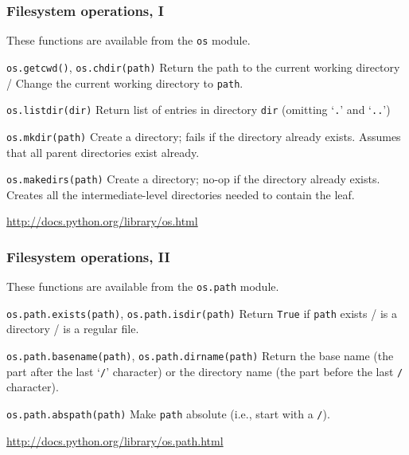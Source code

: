 \documentclass[english,serif,mathserif,xcolor=pdftex,dvipsnames,table]{beamer}
\begin{document}
\begin{frame}[fragile]
  \frametitle{Filesystem operations, I}
  \small
  These functions are available from the \texttt{os} module.

  \begin{describe}{\lstinline|os.getcwd()|, \lstinline|os.chdir(path)|}
    Return the path to the current working directory /
    Change the current working directory to \texttt{path}.
  \end{describe}

  \begin{describe}{\lstinline|os.listdir(dir)|}
    Return list of entries in directory \texttt{dir} (omitting
    `\texttt{.}' and `\texttt{..}')
  \end{describe}

  \begin{describe}{\lstinline|os.mkdir(path)|}
    Create a directory; fails if the directory already exists.
    Assumes that all parent directories exist already.
  \end{describe}

  \begin{describe}{\lstinline|os.makedirs(path)|}
    Create a directory; no-op if the directory already exists.
    Creates all the intermediate-level directories needed to contain
    the leaf.
  \end{describe}

  \begin{references}
    \url{http://docs.python.org/library/os.html}
  \end{references}
\end{frame}


\begin{frame}[fragile]
  \frametitle{Filesystem operations, II}
  These functions are available from the \texttt{os.path} module.

  \begin{describe}{\lstinline|os.path.exists(path)|,
      \lstinline|os.path.isdir(path)|}
    Return \texttt{True} if \texttt{path} exists / is a directory / is
    a regular file.
  \end{describe}

  \begin{describe}{\lstinline|os.path.basename(path)|,
      \lstinline|os.path.dirname(path)|}
    Return the base name (the part after the last `\texttt{/}'
    character) or the directory name (the part before the last
    \texttt{/} character).
  \end{describe}

  \begin{describe}{\lstinline|os.path.abspath(path)|}
    Make \texttt{path} absolute (i.e., start with a \texttt{/}).
  \end{describe}

  \begin{references}
    \url{http://docs.python.org/library/os.path.html}
  \end{references}
\end{frame}
\end{document}
